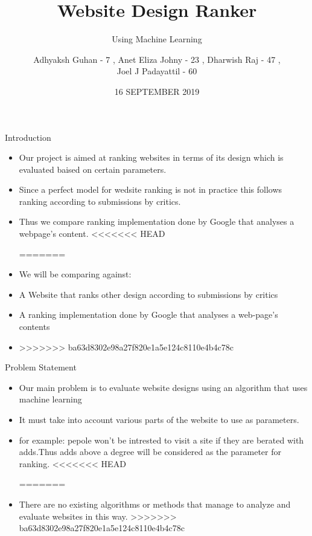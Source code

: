 \documentclass[11pt]{beamer}
\begin{document}
	\title{\textbf{Website Design Ranker}}
	\subtitle{Using Machine Learning}
	\date{16 SEPTEMBER 2019}
	\author{{\scriptsize Adhyaksh Guhan - 7 , Anet Eliza Johny - 23 , Dharwish Raj - 47 , \\ Joel J Padayattil - 60}}
	\begin{frame}[plain]
		\maketitle
	\end{frame}
	\begin{frame}{Introduction}
		\begin{itemize}
			
			
			\item Our project is aimed at ranking websites in terms of its design which is evaluated baised on certain parameters.
			
			\item Since a perfect model for wedsite ranking  is not in practice this  follows ranking according to submissions by critics.
			
			\item Thus we compare ranking implementation done by Google that analyses a webpage's content.
<<<<<<< HEAD
			
=======
		
		

			\item We will be comparing against:
				\item A Website that ranks other design according to submissions by critics
				\item A ranking implementation done by Google that analyses a web-page's contents
				\item 

>>>>>>> ba63d8302e98a27f820e1a5e124c8110e4b4c78c
		\end{itemize}
	\end{frame}
	\begin{frame}{Problem Statement}
		\begin{itemize}
<<<<<<< HEAD

=======
>>>>>>> ba63d8302e98a27f820e1a5e124c8110e4b4c78c
			\item Our main problem is to evaluate website designs using an algorithm that uses machine learning
			
			\item It must take into account various parts of the website to use as parameters.
			
			\item for example: pepole won't be intrested to visit a site if they are berated with adds.Thus adds above a degree will be considered as the parameter for ranking.
<<<<<<< HEAD

=======
			\item There are no existing algorithms or methods that manage to analyze and evaluate websites in this way.
>>>>>>> ba63d8302e98a27f820e1a5e124c8110e4b4c78c
		\end{itemize}
	\end{frame}
\end{document}
